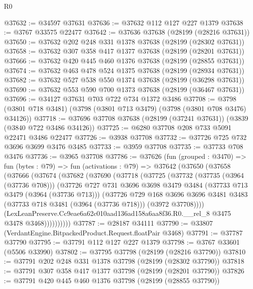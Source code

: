 \begin{lexlean}{R0}
\begin{coremodule}
@37632 := @34597 @37631
@37636 := @37632 @112 @127 @227 @1379
@37638 := @3767 @33575 @22477
@37642 := @37636 @37638 (@28199 (@28216 @37631))
@37650 := @37632 @202 @248 @331 @1378 @37638 (@28199 (@28302 @37631))
@37658 := @37632 @307 @358 @417 @1377 @37638 (@28199 (@28201 @37631))
@37666 := @37632 @420 @445 @460 @1376 @37638 (@28199 (@28855 @37631))
@37674 := @37632 @463 @478 @524 @1375 @37638 (@28199 (@28934 @37631))
@37682 := @37632 @527 @538 @550 @1374 @37638 (@28199 (@36298 @37631))
@37690 := @37632 @553 @590 @700 @1373 @37638 (@28199 (@36467 @37631))
@37696 := @34127 @37631 @703 @722 @734 @1372 @3486
@37708 := @3798 (@3801 @718 @3481) (@3798 (@3801 @713 @3479) (@3798 (@3801 @708 @3476) @34126))
@37718 := @37696 @37708 @37638 (@28199 (@37241 @37631)) (@3839 (@3840 @722 @3486 @34126))
@37725 := @6280 @37708 @208 @733 @5091 @22471 @3486 @22477
@37726 := @3938 @37708
@37732 := @37726 @725 @732 @3696 @3699 @3476 @3485
@37733 := @3959 @37708
@37735 := @37733 @708 @3476
@37736 := @3965 @37708
@37786 := @37626
    (fun (grouped : @3470) =>
    fun (bytes : @79) =>
    fun (activations : @79) =>
    @37642
      (@37650
        (@37658
          (@37666
            (@37674
              (@37682
                (@37690
                  (@37718
                    (@37725
                      (@37732
                        (@37735 (@3964 (@37736 @708)))
                        (@37726
                          @727
                          @731
                          @3696
                          @3698
                          @3479
                          @3484
                          (@37733 @713 @3479 (@3964 (@37736 @713)))
                          (@37726
                            @729
                            @168
                            @3696
                            @3696
                            @3481
                            @3483
                            (@37733 @718 @3481 (@3964 (@37736 @718)))
                            (@3972 @37708))))
                      (LexLeanPreserve.Cc9eae6a62c010aad136ad158a6aa8f36.R0.__rel_8
                        @3475
                        @3478
                        @3468))))))))))
@37787 := @28187 @34111
@37790 := @33807 (VerdantEngine.BitpackedProduct.Request.floatPair @3468)
@37791 := @37787 @37790
@37795 := @37791 @112 @127 @227 @1379
@37798 := @3767 @33601 (@5506 @33990)
@37802 := @37795 @37798 (@28199 (@28216 @37790))
@37810 := @37791 @202 @248 @331 @1378 @37798 (@28199 (@28302 @37790))
@37818 := @37791 @307 @358 @417 @1377 @37798 (@28199 (@28201 @37790))
@37826 := @37791 @420 @445 @460 @1376 @37798 (@28199 (@28855 @37790))

\end{coremodule}
\end{lexlean}
